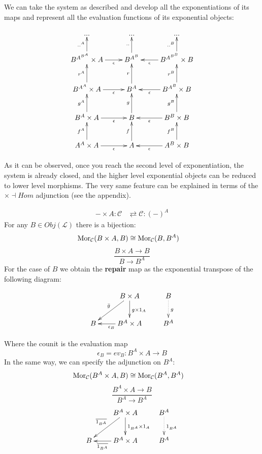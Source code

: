 \documentclass[aps,twocolumn]{revtex4-1}
\begin{document}
 We can take the system as described and develop all the exponentiations of its maps and represent all the evaluation functions of its exponential objects:		

$$
			\xymatrix{
			 ... & ... & ... \\
			  B^{A^{B^A}} \times A \ar[r]_-{\epsilon} \ar[u]^-{..^A} & B^{A^B} \ar[u]^-{..} & B^{A^{B^B}} \times B\ar[l]^-{\epsilon}\ar[u]^-{..^B} \\
			 B^{A^A} \times A \ar[r]_-{\epsilon} \ar[u]^-{r^A} & B^A \ar[u]^-{r} & B^{A^B} \times B\ar[l]^-{\epsilon}\ar[u]^-{r^B} \\
			B^A \times A \ar[r]_-{\epsilon} \ar[u]^-{g^A} & B \ar[u]^-{g} & B^B \times B\ar[l]^-{\epsilon}\ar[u]^-{g^B} \\
			A^A \times A \ar[r]_-{\epsilon} \ar[u]^-{f^A} & 
			A\ar[u]^-{f} & A^B\times B\ar[l]^-{\epsilon}\ar[u]^-{f^B} }
			$$

As it can be observed, once you reach the second level of exponentiation, the system is already closed, and the higher level exponential objects can be reduced to lower level morphisms. The very same feature can be explained in terms of the $\times \dashv Hom$ adjunction (see the appendix). 

\begin{align*}
- \times A: \mathcal{C} & \rightleftarrows \mathcal{C}: (-)^A
\end{align*}
For any $B \in Obj(\mathcal{L})$ there is a bijection:
\begin{align*}
\mathop{\rm Mor}\nolimits_{\mathcal{C}}(B \times A, B) & \cong  \mathop{\rm Mor}\nolimits_{\mathcal{C}}(B, B^A)
\end{align*}
		$$
			\frac{B \times A \longrightarrow B}{B \longrightarrow B^A}
		$$
For the case of $B$ we obtain the \textbf{repair} map as the exponential transpose of the following diagram:

			$$
			\xymatrix{
			& B \times A \ar[d]^{g \times 1_A} \ar[dl]_{\bar{g}} & B \ar@{.>}[d]^{g}\\
			B & B^A \times A \ar[l]^{\epsilon_B} & B^A}
			$$
	
Where the counit is the evaluation map
		$$
			\epsilon_B = ev_B \colon B^A \times A \longrightarrow B
		$$
In the same way, we can specify the adjunction on $B^A$:
\begin{align*}
\mathop{\rm Mor}\nolimits_{\mathcal{C}}(B^A \times A, B) & \cong  \mathop{\rm Mor}\nolimits_{\mathcal{C}}(B^A, B^{A})
\end{align*}
	$$
			\frac{B^A \times A \longrightarrow B}{B^A \longrightarrow B^{A}}
		$$
				$$
			\xymatrix{
			& B^A \times A \ar[d]^{1_{B^A} \times 1_A} \ar[dl]_{\overline{1_{B^A}}} & B^A \ar@{.>}[d]^{1_{B^A}}\\
			B & B^A \times A \ar[l]^-{\overline{1_{B^A}}} & B^A}
			$$
\end{document}
